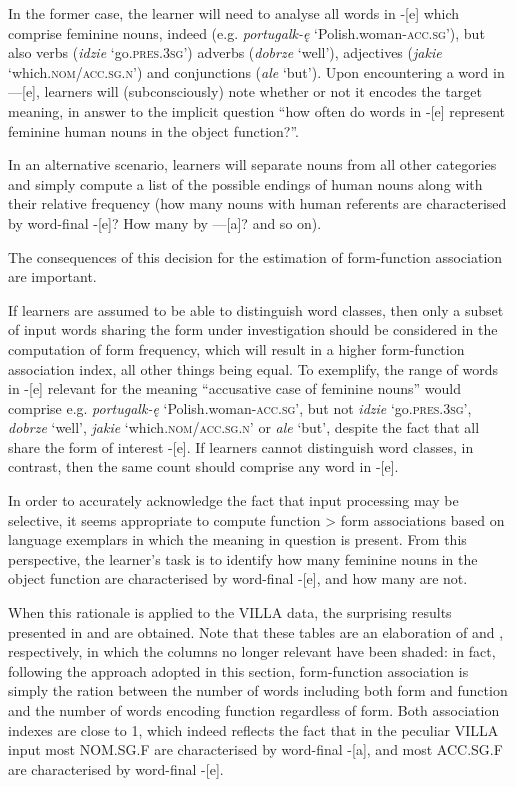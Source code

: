In the former case, the learner will need to analyse all words in -[e] which comprise feminine nouns, indeed (e.g. \textit{portugalk-ę} ‘Polish.woman-\textsc{acc.sg’}), but also verbs (\textit{idzie} ‘go.\textsc{pres.3sg’}) adverbs (\textit{dobrze} ‘well’), adjectives (\textit{jakie} ‘which.\textsc{nom{\slash}acc.sg.n}’) and conjunctions (\textit{ale} ‘but’). Upon encountering a word in —[e], learners will (subconsciously) note whether or not it encodes the target meaning, in answer to the implicit question “how often do words in -[e] represent feminine human nouns in the object function?”.

In an alternative scenario, learners will separate nouns from all other categories and simply compute a list of the possible endings of human nouns along with their relative frequency (how many nouns with human referents are characterised by word-final -[e]? How many by —[a]? and so on).

The consequences of this decision for the estimation of form-function association are important.

If learners are assumed to be able to distinguish word classes, then only a subset of input words sharing the form under investigation should be considered in the computation of form frequency, which will result in a higher form-function association index, all other things being equal. To exemplify, the range of words in -[e] relevant for the meaning “accusative case of feminine nouns” would comprise e.g. \textit{portugalk-ę} ‘Polish.woman-\textsc{acc.sg’}, but not \textit{idzie} ‘go.\textsc{pres.3sg}’, \textit{dobrze} ‘well’, \textit{jakie} ‘which.\textsc{nom/acc.sg.n}’ or \textit{ale} ‘but’, despite the fact that all share the form of interest -[e]. If learners cannot distinguish word classes, in contrast, then the same count should comprise any word in -[e].

In order to accurately acknowledge the fact that input processing may be selective, it seems appropriate to compute function > form associations based on language exemplars in which the meaning in question is present. From this perspective, the learner’s task is to identify how many feminine nouns in the object function  are characterised by word-final -[e], and how many are not. 

When this rationale is applied to the VILLA data, the surprising results presented in  and  are obtained. Note that these tables are an elaboration of  and , respectively, in which the columns no longer relevant have been shaded: in fact, following the approach adopted in this section, form-function association is simply the ration between the number of words including both form and function and the number of words encoding function regardless of form. Both association indexes are close to 1, which indeed reflects the fact that in the peculiar VILLA input most NOM.SG.F are characterised by word-final -[a], and most ACC.SG.F are characterised by word-final -[e].

